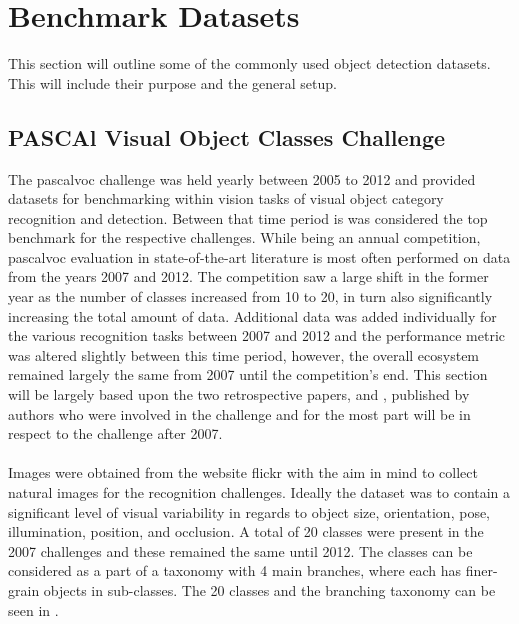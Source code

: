 \section{Benchmark Datasets}
This section will outline some of the commonly used object detection datasets. This will include their purpose and the general setup.


\subsection{PASCAl Visual Object Classes Challenge}
The \gls{pascalvoc} challenge \cite{pascalvoc2012} was held yearly between 2005 to 2012 and provided datasets for benchmarking within vision tasks of visual object category recognition and detection. Between that time period is was considered the top benchmark for the respective challenges. While being an annual competition, \gls{pascalvoc} evaluation in state-of-the-art literature is most often performed on data from the years 2007 and 2012. The competition saw a large shift in the former year as the number of classes increased from 10 to 20, in turn also significantly increasing the total amount of data. Additional data was added individually for the various recognition tasks between 2007 and 2012 and the performance metric was altered slightly between this time period, however, the overall ecosystem remained largely the same from 2007 until the competition's end. This section will be largely based upon the two retrospective papers, \cite{pascalvoc2010} and \cite{pascalvoc2015}, published by authors who were involved in the challenge and for the most part will be in respect to the challenge after 2007.
\\\\
Images were obtained from the website flickr \cite{flickr} with the aim in mind to collect natural images for the recognition challenges. Ideally the dataset was to contain a significant level of visual variability in regards to object size, orientation, pose, illumination, position, and occlusion. A total of 20 classes were present in the 2007 challenges and these remained the same until 2012. The classes can be considered as a part of a taxonomy with 4 main branches, where each has finer-grain objects in sub-classes. The 20 classes and the branching taxonomy can be seen in .


